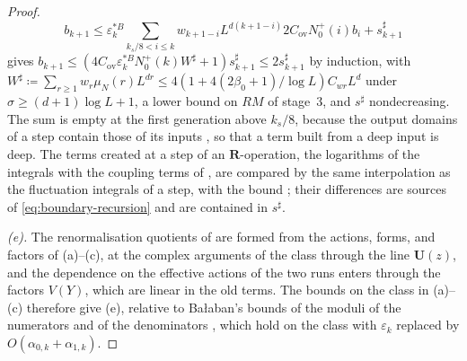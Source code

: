 \documentclass[11pt]{preprint}
\numberwithin{equation}{section}
\theoremstyle{definition}
\theoremstyle{remark}
\theoremstyle{plain}
\begin{document}
\begin{proof}
\begin{equation}\label{eq:boundary-recursion}
    b_{k+1} \leq \varepsilon^{*B}_k\sum_{k_s/8 < i \leq k}w_{k+1-i}L^{d(k+1-i)}2C_{\mathrm{ov}}N^+_0(i)b_i + s^\sharp_{k+1}
\end{equation}
gives $b_{k+1} \leq (4C_{\mathrm{ov}}\varepsilon^{*B}_kN^+_0(k)W^\sharp + 1)s^\sharp_{k+1} \leq 2s^\sharp_{k+1}$ by induction, with $W^\sharp \coloneqq \sum_{r\geq1}w_r\mu_N(r)L^{dr} \leq 4(1 + 4(2\beta_0 + 1)/\log L)C_{wr}L^d$ under $\sigma \geq (d + 1)\log L + 1$, a lower bound on $RM$ of stage~3, and $s^\sharp$ nondecreasing. The sum is empty at the first generation above $k_s/8$, because the output domains of a step contain those of its inputs \cite[p.~12]{BalabanRG2}, so that a term built from a deep input is deep. The terms created at a step of an $\mathbf R$-operation, the logarithms of the integrals \cite[(1.60)]{BalabanLFR1} with the coupling terms of \cite[(1.62)]{BalabanLFR1}, are compared by the same interpolation as the fluctuation integrals of a step, with the bound \cite[(1.70), p.~192]{BalabanLFR1}; their differences are sources of \eqref{eq:boundary-recursion} and are contained in $s^\sharp$.

\emph{(e).} The renormalisation quotients of \cite[(1.1), (1.2)]{BalabanLFR2} are formed from the actions, forms, and factors of (a)--(c), at the complex arguments of the class through the line $\mathbf U(z)$, and the dependence on the effective actions of the two runs enters through the factors $V(Y)$, which are linear in the old terms. The bounds on the class in (a)--(c) therefore give (e), relative to Ba{\l}aban's bounds of the moduli of the numerators and of the denominators \cite[pp.~357--358]{BalabanLFR2}, which hold on the class with $\varepsilon_k$ replaced by $O(\alpha_{0,k} + \alpha_{1,k})$.


\end{proof}
\end{document}
